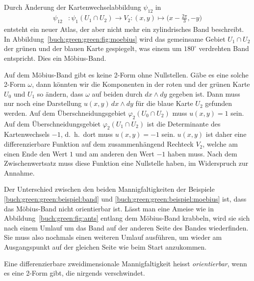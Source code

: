 \begin{beispiel}
\label{buch:green:green:beispiel:moebius}
%
Durch Änderung der Kartenwechselabbildung $\psi_{12}$ in
\begin{align*}
\psi_{12}&\colon
\psi_1(U_1\cap U_2)
\to
V_2
:(x,y) \mapsto \biggl(x-\frac{2\pi}3,-y\biggr)
\end{align*}
entsteht ein neuer Atlas, der aber nicht mehr ein zylindrisches Band
beschreibt.
In Abbildung~\ref{buch:green:green:fig:moebius} wird das gemeinsame
Gebiet $U_1\cap U_2$ der grünen und der blauen Karte gespiegelt,
was einem um $180^\circ$ verdrehten Band entspricht.
Dies ein Möbius-Band.

Auf dem Möbius-Band gibt es keine 2-Form ohne Nullstellen.
%
Gäbe es eine solche 2-Form $\omega$, dann könnten wir die Komponenten
in der roten und der grünen Karte $U_0$ und $U_1$ so ändern, dass
$\omega$ auf beiden durch $dx\wedge dy$ gegeben ist.
Dann muss nur noch eine Darstellung $u(x,y)\,dx\wedge dy$ für die 
blaue Karte $U_2$ gefunden werden.
Auf dem Überschneidungsgebiet $\varphi_2(U_0\cap U_2)$ muss $u(x,y)=1$
sein.
Auf dem Überschneidungsgebiet $\varphi_2(U_1\cap U_2)$ ist die 
Determinante des Kartenwechsels $-1$, d.~h.~dort muss $u(x,y)=-1$
sein.
$u(x,y)$ ist daher eine differenzierbare Funktion auf dem zusammenhängend
Rechteck $V_2$, welche am einen Ende den Wert $1$ und am anderen den 
Wert $-1$ haben muss.
Nach dem Zwischenwertsatz muss diese Funktion eine Nullstelle haben,
im Widerspruch zur Annahme.
\end{beispiel}

%
Der Unterschied zwischen den beiden Mannigfaltigkeiten der Beispiele
\ref{buch:green:green:beispiel:band}
und
\ref{buch:green:green:beispiel:moebius}
ist, dass das Möbius-Band nicht orientierbar ist.
Lässt man eine Ameise wie in Abbildung~\ref{buch:green:fig:ants}
entlang dem Möbius-Band krabbeln, wird sie
sich nach einem Umlauf um das Band auf der anderen Seite des Bandes
wiederfinden.
Sie muss also nochmals einen weiteren Umlauf ausführen, um wieder
am Ausgangspunkt auf der gleichen Seite wie beim Start anzukommen.

\begin{definition}
\label{buch:green:def:orientierung}
Eine differenzierbare zweidimensionale Mannigfaltigkeit heisst 
\emph{orientierbar}, wenn es eine 2-Form gibt, die nirgends
%
verschwindet.
\end{definition}

